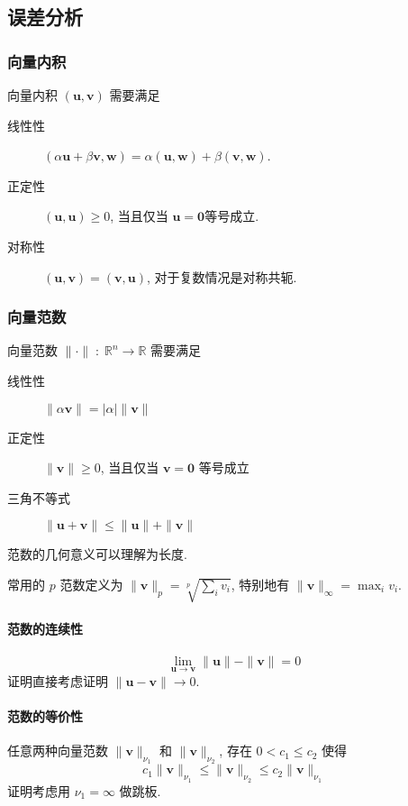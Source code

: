 \documentclass{ctexart}
\newcommand{\Rset}{\mathbb{R}}
\begin{document}
\subsection{误差分析}
\subsubsection{向量内积}
    向量内积 $(\mathbf{u}, \mathbf{v})$ 需要满足
        \begin{description}
        \item[线性性] $(\alpha \mathbf{u} + \beta \mathbf{v}, \mathbf{w}) = \alpha (\mathbf{u}, \mathbf{w}) + \beta (\mathbf{v}, \mathbf{w})$.
        \item[正定性] $(\mathbf{u}, \mathbf{u}) \ge 0$, 当且仅当 $\mathbf{u} = \mathbf{0} $等号成立.
        \item[对称性] $(\mathbf{u}, \mathbf{v}) = (\mathbf{v},\mathbf{u})$, 对于复数情况是对称共轭.
    \end{description}
\subsubsection{向量范数}
    向量范数 $\|\cdot\|\;:\;\Rset^n \to \Rset$ 需要满足
    \begin{description}
        \item[线性性] $\|\alpha \mathbf{v}\| = |\alpha| \|\mathbf{v}\|$
        \item[正定性] $\|\mathbf{v}\| \ge 0$, 当且仅当 $\mathbf{v} = \mathbf{0}$ 等号成立
        \item [三角不等式] $\| \mathbf{u} + \mathbf{v} \| \le \|\mathbf{u} \| + \|\mathbf{v}\|$
    \end{description}
    范数的几何意义可以理解为长度.\par
    常用的 $p$ 范数定义为 $\|\mathbf{v}\|_p = \sqrt[p]{\sum_i v_i}$,
    特别地有 $\|\mathbf{v}\|_{\infty} = \max_i v_i$.\par
\paragraph{范数的连续性}
    \[\lim_{\mathbf{u} \to \mathbf{v}} \|\mathbf{u}\| - \|\mathbf{v}\| = 0\]
    证明直接考虑证明 $\|\mathbf{u} - \mathbf{v}\| \to 0$.
\paragraph{范数的等价性}
    任意两种向量范数 $\|\mathbf{v}\|_{\nu_1}$ 和 $\|\mathbf{v}\|_{\nu_2}$, 存在 $0 < c_1 \le c_2$ 使得 \[
        c_1 \|\mathbf{v}\|_{\nu_1} \le \|\mathbf{v}\|_{\nu_2} \le c_2 \|\mathbf{v}\|_{\nu_1}\]
    证明考虑用 $\nu_1 = \infty$ 做跳板.
\end{document}
